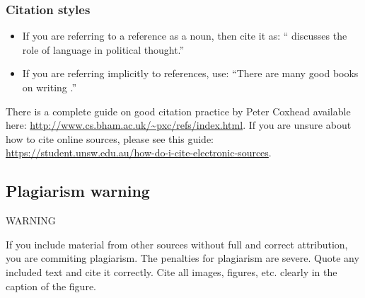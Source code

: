 \documentclass{l4proj}
\begin{document}
\subsubsection{Citation styles}

\begin{itemize}
\item If you are referring to a reference as a noun, then cite it as: ``\citet{Orw68} discusses the role of language in political thought.''
\item If you are referring implicitly to references, use: ``There are many good books on writing \citep{Orw68, Wil09, Pin15}.''
\end{itemize}

There is a complete guide on good citation practice by Peter Coxhead available here: \url{http://www.cs.bham.ac.uk/~pxc/refs/index.html}. 
If you are unsure about how to cite online sources, please see this guide: \url{https://student.unsw.edu.au/how-do-i-cite-electronic-sources}.

\subsection{Plagiarism warning}

\begin{highlight_title}{WARNING}
    
    If you include material from other sources without full and correct attribution, you are commiting plagiarism. The penalties for plagiarism are severe.
    Quote any included text and cite it correctly. Cite all images, figures, etc. clearly in the caption of the figure.
\end{highlight_title}


\end{document}
